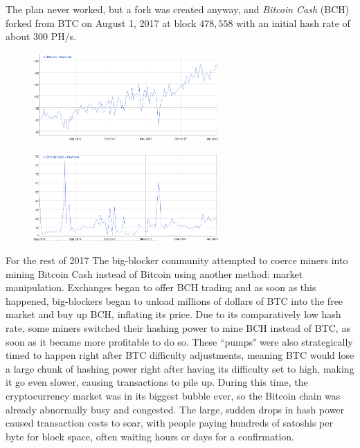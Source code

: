 \documentclass{report}
\begin{document}
		The plan never worked, but a fork was created anyway, and \textit{Bitcoin Cash} (BCH) \cite{bch}   forked from BTC on August 1, 2017 at block $478,558$ with an initial hash rate of about $300$ PH/s. \\
		
		\begin{figure}[H]
		\centering
		\begin{minipage}{.5\textwidth}
		  \centering
		  \includegraphics[width=200pt]{img/btc-hashrate-aug2017-jan2018.png}
		  \label{fig:btchashrate2017}
		\end{minipage}%
		\begin{minipage}{.5\textwidth}
		  \centering
		  \includegraphics[width=200pt]{img/bch-hashrate-aug2017-jan2018.png}
		  \label{fig:fig:bchhashrate2017}
		\end{minipage}
		\end{figure}
		For the rest of 2017 The big-blocker community attempted to coerce miners into mining Bitcoin Cash instead of Bitcoin using another method: market manipulation.  Exchanges  began to offer BCH trading  and as soon as this happened, big-blockers began to unload millions of dollars of BTC into the free market and buy up BCH, inflating its price. Due to its comparatively low hash rate, some miners switched their hashing power to mine BCH instead of BTC, as soon as it became more profitable to do so. These ``pumps" were also strategically timed to happen right after BTC difficulty  adjustments, meaning BTC would lose a large chunk of hashing power right after having its difficulty set to high, making it go even slower, causing transactions to pile up. During this time, the cryptocurrency market was in its biggest bubble  ever, so the Bitcoin chain was already abnormally busy and congested. The large, sudden drops in hash power caused transaction costs to soar, with people paying hundreds of satoshis per byte for block space, often waiting hours or days for a confirmation. \\
		
\end{document}
